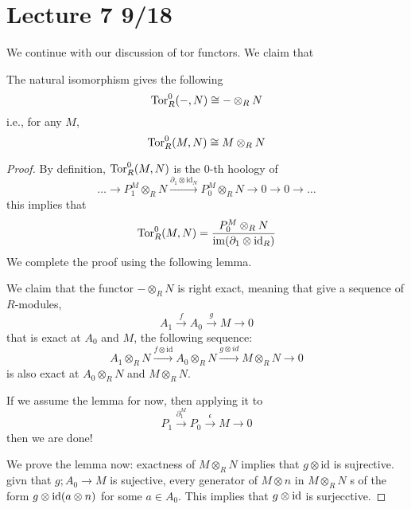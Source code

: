 \section{Lecture 7 9/18}
We continue with our discussion of tor functors. We claim that 
\begin{prop}
    The natural isomorphism gives the following 
    \begin{equation*}
        \text{Tor}_R^0(-,N)\cong-\otimes_RN
    \end{equation*}
    i.e., for any $M$,
    \begin{equation*}
        \text{Tor}_R^0(M,N)\cong M\otimes_RN
    \end{equation*}
\end{prop}
\begin{proof}
    By definition, $\text{Tor}_R^0(M,N)$ is the $0$-th hoology of 
    \begin{equation*}
        \dots\to P_1^M\otimes_RN\xrightarrow{\partial_1\otimes\text{id}_N}P_0^M\otimes_RN\to0\to0\to\dots
    \end{equation*}
    this implies that 
    \begin{equation*}
        \text{Tor}_R^0(M,N)=\frac{P_0^M\otimes_RN}{\operatorname{im}(\partial_1\otimes\text{id}_R)}
    \end{equation*}
    We complete the proof using the following lemma.
    \begin{lem}
    We claim that the functor $-\otimes_RN$ is right exact, meaning that give a sequence of $R$-modules,
    \begin{equation*}
        A_1\xrightarrow{f}A_0\xrightarrow{g}M\to 0
    \end{equation*}
    that is exact at $A_0$ and $M$, the following sequence:
    \begin{equation*}
        A_1\otimes_RN\xrightarrow{f\otimes\text{id}}A_0\otimes_RN\xrightarrow{g\otimes id}M\otimes_RN\to 0
    \end{equation*}
    is also exact at $A_0\otimes_RN$ and $M\otimes_RN$.
    \end{lem}

    If we assume the lemma for now, then applying it to 
    \begin{equation*}
        P_1\xrightarrow{\partial_1^M}P_0\xrightarrow{\epsilon}M\to 0
    \end{equation*}
    then we are done!

    We prove the lemma now: exactness of $M\otimes_RN$ implies that $g\otimes\text{id}$ is sujrective. givn that $g;A_0\to M$ is sujective, every generator of $M\otimes n$ in $M\otimes_RN$ s of the form $g\otimes\text{id}(a\otimes n)$ for some $a\in A_0$. This implies that $g\otimes\text{id}$ is surjecctive. 


\end{proof}
